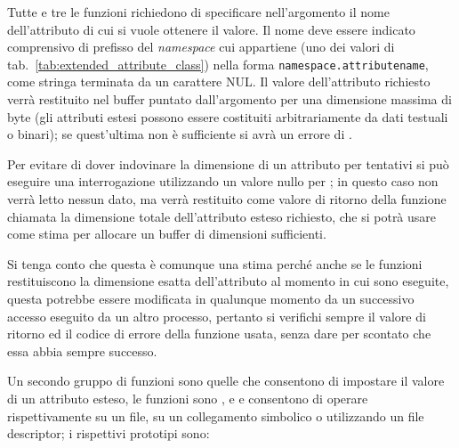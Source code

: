 Tutte e tre le funzioni richiedono di specificare nell'argomento 
il nome dell'attributo di cui si vuole ottenere il valore. Il nome deve essere
indicato comprensivo di prefisso del \textit{namespace} cui appartiene (uno
dei valori di tab.~\ref{tab:extended_attribute_class}) nella forma
\texttt{namespace.attributename}, come stringa terminata da un carattere NUL.
Il valore dell'attributo richiesto verrà restituito nel buffer puntato
dall'argomento  per una dimensione massima di  byte
(gli attributi estesi possono essere costituiti arbitrariamente da dati
testuali o binari); se quest'ultima non è sufficiente si avrà un errore di
.

Per evitare di dover indovinare la dimensione di un attributo per tentativi si
può eseguire una interrogazione utilizzando un valore nullo per ;
in questo caso non verrà letto nessun dato, ma verrà restituito come valore di
ritorno della funzione chiamata la dimensione totale dell'attributo esteso
richiesto, che si potrà usare come stima per allocare un buffer di dimensioni
sufficienti.

Si tenga conto che questa è comunque una stima perché anche se le funzioni
restituiscono la dimensione esatta dell'attributo al momento in cui sono
eseguite, questa potrebbe essere modificata in qualunque momento da un
successivo accesso eseguito da un altro processo, pertanto si verifichi sempre
il valore di ritorno ed il codice di errore della funzione usata, senza dare
per scontato che essa abbia sempre successo.

Un secondo gruppo di funzioni sono quelle che consentono di impostare il
valore di un attributo esteso, le funzioni sono ,
 e  e consentono di operare rispettivamente
su un file, su un collegamento simbolico o utilizzando un file descriptor; i
rispettivi prototipi sono:

